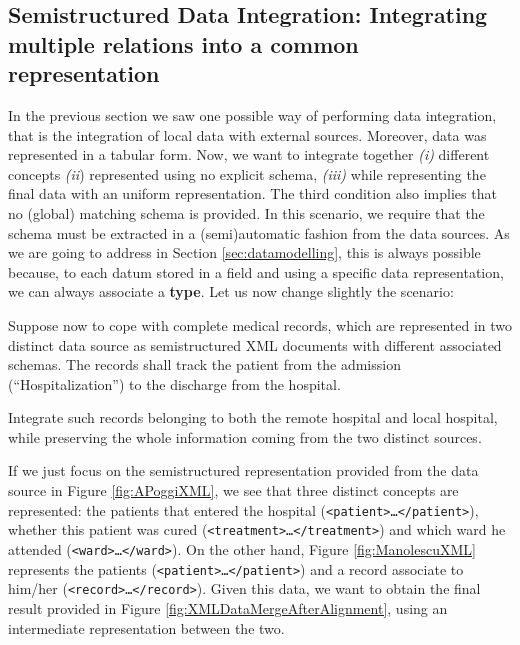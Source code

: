 \subsection{Semistructured Data Integration: Integrating multiple relations into a common representation}\label{sec:SDIIMRIACR}
In the previous section we saw one possible way of performing data integration, that is the integration of local data with external sources. Moreover, data was represented in a tabular form. Now, 
we want to integrate together \textit{(i)} different concepts \textit{(ii}) represented using no explicit schema, \textit{(iii)} while representing the final data with an uniform representation. The third condition also implies that no (global) matching schema is provided. In this scenario, we require that the schema must be extracted in a (semi)automatic fashion from the data sources. As we are going to address in Section \ref{sec:datamodelling}, this is always possible because, to each datum stored in a field and using a specific data representation, we can always associate a \textbf{type}. %
Let us now change slightly the scenario:

\begin{example}
  Suppose now to cope with complete medical records, which are represented in two distinct data source as semistructured XML  documents with different associated schemas. The records shall track the patient from the admission (``Hospitalization'') to the discharge from the hospital. 
  
  Integrate such records belonging to both the remote hospital and  local hospital, while preserving the whole information coming from the two distinct sources.
  
 If we just focus on the semistructured representation provided from the data source in Figure \vref{fig:APoggiXML}, we  see that three distinct concepts are represented: the patients that entered the hospital (\texttt{<patient>\dots </patient>}), whether this patient was cured (\texttt{<treatment>\dots </treatment>}) and which ward he attended (\texttt{<ward>\dots</ward>}). On the other hand, Figure \ref{fig:ManolescuXML}  represents the patients (\texttt{<patient>\dots </patient>}) and a record associate to him/her (\texttt{<record>\dots</record>}). Given this data, we want to obtain the final result provided in Figure \vref{fig:XMLDataMergeAfterAlignment}, using an intermediate representation between the two.
\end{example}



